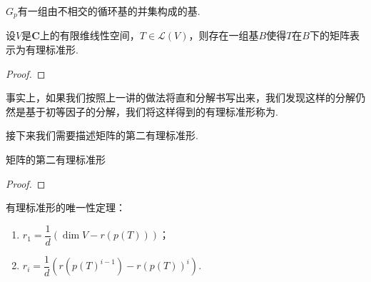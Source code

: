 \begin{corollary}
    $G_p$有一组由不相交的循环基的并集构成的基.
\end{corollary}

\begin{corollary} \label{cor:20:第二有理基存在}
    设$V$是$\mathbf{C}$上的有限维线性空间，$T\in\mathcal{L}(V)$，则存在一组基$B$使得$T$在$B$下的矩阵表示为有理标准形.
\end{corollary}
\begin{proof}

\end{proof}
事实上，如果我们按照上一讲的做法将直和分解书写出来，我们发现这样的分解仍然是基于初等因子的分解，我们将这样得到的有理标准形称为.

接下来我们需要描述矩阵的第二有理标准形.
\begin{corollary}
    矩阵的第二有理标准形
\end{corollary}
\begin{proof}

\end{proof}

有理标准形的唯一性定理：
\begin{theorem}
    \begin{enumerate}
        \item $r_1=\dfrac{1}{d}(\dim V-r(p(T)))$；
        \item $r_i=\dfrac{1}{d}(r(p(T)^{i-1})-r(p(T))^i)$.
    \end{enumerate}
\end{theorem}

